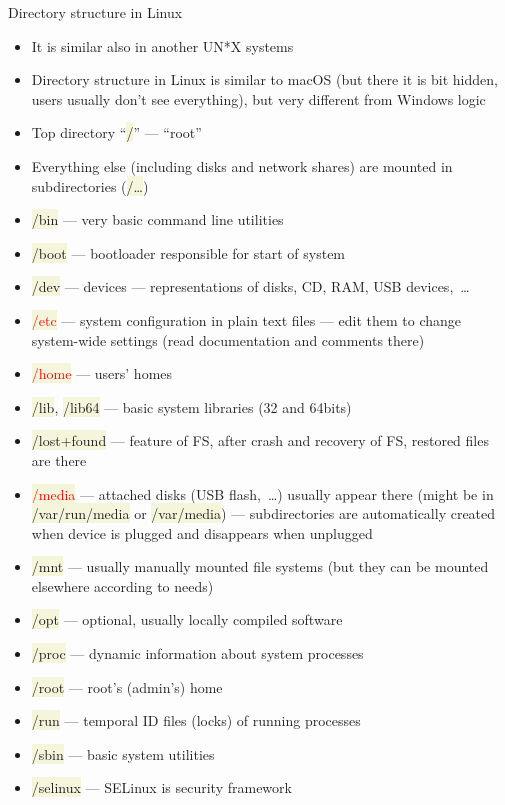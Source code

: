 \documentclass[compress, ucs, xelatex, 11pt, xcolor=svgnames, aspectratio=169,
	hyperref={
		bookmarks=true,
		unicode=true,
		colorlinks=true,
		pdftitle={Linux, command line and MetaCentrum},
		plainpages=false,
		pdfauthor={Vojtech Zeisek},
		pdfsubject={Course about use of Linux command line, writing shell scripts and using MetaCentrum of CESNET},
		pdfcreator={XeLaTeX},
		pdfkeywords={Linux, GNU, BASH, shell, command line, MetaCentrum},
		linkcolor=DarkRed, %
		anchorcolor=DarkBlue, %
		citecolor=Indigo, %
		filecolor=NavyBlue, %
		menucolor=DarkMagenta, %
		urlcolor=DarkBlue, %
		pdftex},
	url={hyphens, lowtilde} %
	]{beamer}
\renewcommand{\texttt}[1]{\colorbox{Beige}{{\ttfamily #1}}}
\renewcommand{\alert}[1]{\textcolor{red}{#1}}
\begin{document}
\begin{frame}[allowframebreaks]{Directory structure in Linux}
	\begin{itemize}
		\item It is similar also in another UN*X systems
		\item Directory structure in Linux is similar to macOS (but there it is bit hidden, users usually don't see everything), but very different from Windows logic
		\item Top directory \enquote{\texttt{/}} --- \enquote{root}
		\item Everything else (including disks and network shares) are mounted in subdirectories (\texttt{/\ldots})
		\item \texttt{/bin} --- very basic command line utilities
		\item \texttt{/boot} --- bootloader responsible for start of system
		\item \texttt{/dev} --- devices --- representations of disks, CD, RAM, USB devices,~\ldots
		\item \alert{\texttt{/etc}} --- system configuration in plain text files --- edit them to change system-wide settings (read documentation and comments there)
		\item \alert{\texttt{/home}} --- users' homes
		\item \texttt{/lib}, \texttt{/lib64} --- basic system libraries (32 and 64bits)
		\item \texttt{/lost+found} --- feature of FS, after crash and recovery of FS, restored files are there
		\item \alert{\texttt{/media}} --- attached disks (USB flash,~\ldots) usually appear there (might be in \texttt{/var/run/media} or  \texttt{/var/media}) --- subdirectories are automatically created when device is plugged and disappears when unplugged
		\item \texttt{/mnt} --- usually manually mounted file systems (but they can be mounted elsewhere according to needs)
		\item \texttt{/opt} --- optional, usually locally compiled software
		\item \texttt{/proc} --- dynamic information about system processes
		\item \texttt{/root} --- root's (admin's) home
		\item \texttt{/run} --- temporal ID files (locks) of running processes
		\item \texttt{/sbin} --- basic system utilities
		\item \texttt{/selinux} --- SELinux is security framework

\end{itemize}
\end{frame}
\end{document}
